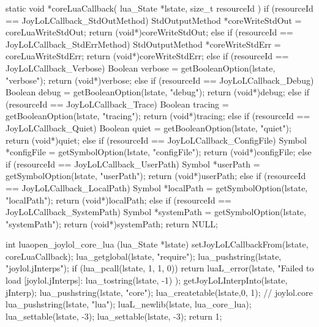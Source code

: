 static void *coreLuaCallback(
  lua_State *lstate,
  size_t resourceId
) {
  if (resourceId == JoyLoLCallback_StdOutMethod) {
    StdOutputMethod *coreWriteStdOut =
      coreLuaWriteStdOut;
    return (void*)coreWriteStdOut;
  } else if (resourceId == JoyLoLCallback_StdErrMethod) {
    StdOutputMethod *coreWriteStdErr =
      coreLuaWriteStdErr;
    return (void*)coreWriteStdErr;
  } else if (resourceId == JoyLoLCallback_Verbose) {
    Boolean verbose = getBooleanOption(lstate, "verbose");
    return (void*)verbose;
  } else if (resourceId == JoyLoLCallback_Debug) {
    Boolean debug = getBooleanOption(lstate, "debug");
    return (void*)debug;
  } else if (resourceId == JoyLoLCallback_Trace) {
    Boolean tracing = getBooleanOption(lstate, "tracing");
    return (void*)tracing;
  } else if (resourceId == JoyLoLCallback_Quiet) {
    Boolean quiet = getBooleanOption(lstate, "quiet");
    return (void*)quiet;
  } else if (resourceId == JoyLoLCallback_ConfigFile) {
    Symbol *configFile = getSymbolOption(lstate, "configFile");
    return (void*)configFile;
  } else if (resourceId == JoyLoLCallback_UserPath) {
    Symbol *userPath = getSymbolOption(lstate, "userPath");
    return (void*)userPath;
  } else if (resourceId == JoyLoLCallback_LocalPath) {
    Symbol *localPath = getSymbolOption(lstate, "localPath");
    return (void*)localPath;
  } else if (resourceId == JoyLoLCallback_SystemPath) {
    Symbol *systemPath = getSymbolOption(lstate, "systemPath");
    return (void*)systemPath;
  }
  return NULL;
} 

int luaopen_joylol_core_lua (lua_State *lstate) {
  setJoyLoLCallbackFrom(lstate, coreLuaCallback);
  lua_getglobal(lstate, "require");
  lua_pushstring(lstate, "joylol.jInterps");
  if (lua_pcall(lstate, 1, 1, 0)) {
    return luaL_error(lstate,
      "Failed to load [joylol.jInterps]\nERROR:\n%
      lua_tostring(lstate, -1)
    );
  }
  getJoyLoLInterpInto(lstate, jInterp);
  lua_pushstring(lstate, "core");
  lua_createtable(lstate,0, 1); // joylol.core 
  lua_pushstring(lstate, "lua");
  luaL_newlib(lstate, lua_core_lua);
  lua_settable(lstate, -3);
  lua_settable(lstate, -3);
  return 1;
}
\stopCCode